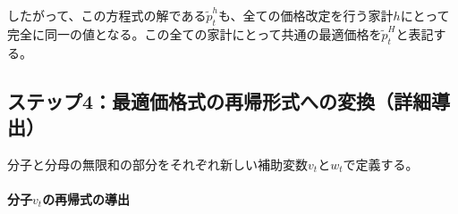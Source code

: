 したがって、この方程式の解である\(\widetilde{p}_t^h\)も、全ての価格改定を行う家計\(h\)にとって完全に同一の値となる。この全ての家計にとって共通の最適価格を\(\widetilde{p}_t^H\)と表記する。

\subsection*{ステップ4：最適価格式の再帰形式への変換（詳細導出）}
\label{sec:appendix_optimal_price_derivation_foc_sub4}

分子と分母の無限和の部分をそれぞれ新しい補助変数\(v_t\)と\(w_t\)で定義する。

\paragraph{分子\(v_t\)の再帰式の導出}
\label{sec:appendix_optimal_price_derivation_foc_sub4_v_deriv}

